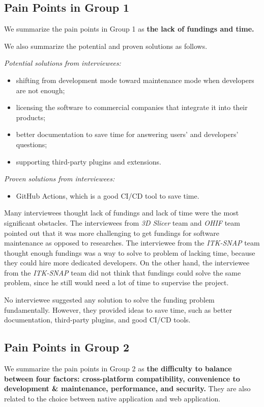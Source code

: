 \subsection{Pain Points in Group 1}
\label{sec_pain_points_1}
We summarize the pain points in Group 1 as
\textbf{the lack of fundings and time.}

We also summarize the potential and proven solutions as follows.

\textit{Potential solutions from interviewees:}
\begin{itemize}
\item shifting from development mode toward maintenance mode when developers are not enough;
\item licensing the software to commercial companies that integrate it into their products;
\item better documentation to save time for answering users' and developers' questions;
\item supporting third-party plugins and extensions.
\end{itemize}

\textit{Proven solutions from interviewees:}
\begin{itemize}
\item GitHub Actions, which is a good CI/CD tool to save time.
\end{itemize}

Many interviewees thought lack of fundings and lack of time were the most significant obstacles. The interviewees from \textit{3D Slicer} team and \textit{OHIF} team pointed out that it was more challenging to get fundings for software maintenance as opposed to researches. The interviewee from the \textit{ITK-SNAP} team thought enough fundings was a way to solve to problem of lacking time, because they could hire more dedicated developers. On the other hand, the interviewee from the \textit{ITK-SNAP} team did not think that fundings could solve the same problem, since he still would need a lot of time to supervise the project.

No interviewee suggested any solution to solve the funding problem fundamentally. However, they provided ideas to save time, such as better documentation, third-party plugins, and good CI/CD tools.

\subsection{Pain Points in Group 2}
\label{sec_pain_points_2}
\label{sec_pain_points_1}
We summarize the pain points in Group 2 as
\textbf{the difficulty to balance between four factors: cross-platform compatibility, convenience to development \& maintenance, performance, and security.} They are also related to the choice between native application and web application.

